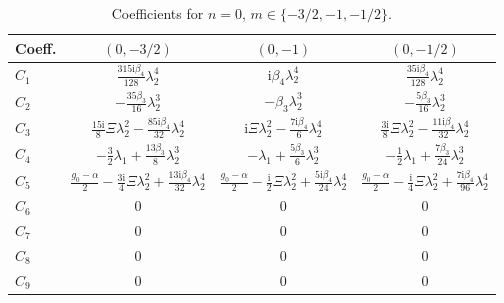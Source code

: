 \documentclass[11pt]{article}
\newcommand{\ii}{\mathrm{i}}
\begin{document}
\begin{table}[htbp]
\centering\small
\caption{Coefficients for $n=0$, $m\in\{-3/2,-1,-1/2\}$.}
\begin{tabular}{lccc}
\toprule
Coeff. & $(0,-3/2)$ & $(0,-1)$ & $(0,-1/2)$ \\
\midrule
$C_1$ & $\tfrac{315\ii\beta_4}{128}\lambda_2^4$ & $\ii\beta_4\lambda_2^4$ & $\tfrac{35\ii\beta_4}{128}\lambda_2^4$ \\
$C_2$ & $-\tfrac{35\beta_3}{16}\lambda_2^3$ & $-\beta_3\lambda_2^3$ & $-\tfrac{5\beta_3}{16}\lambda_2^3$ \\
$C_3$ & $\tfrac{15\ii}{8}\Xi\lambda_2^2-\tfrac{85\ii\beta_4}{32}\lambda_2^4$ & $\ii\Xi\lambda_2^2-\tfrac{7\ii\beta_4}{6}\lambda_2^4$ & $\tfrac{3\ii}{8}\Xi\lambda_2^2-\tfrac{11\ii\beta_4}{32}\lambda_2^4$ \\
$C_4$ & $-\tfrac32\lambda_1+\tfrac{13\beta_3}{8}\lambda_2^3$ & $-\lambda_1+\tfrac{5\beta_3}{6}\lambda_2^3$ & $-\tfrac12\lambda_1+\tfrac{7\beta_3}{24}\lambda_2^3$ \\
$C_5$ & $\tfrac{g_0-\alpha}{2}-\tfrac{3\ii}{4}\Xi\lambda_2^2+\tfrac{13\ii\beta_4}{32}\lambda_2^4$ & $\tfrac{g_0-\alpha}{2}-\tfrac{\ii}{2}\Xi\lambda_2^2+\tfrac{5\ii\beta_4}{24}\lambda_2^4$ & $\tfrac{g_0-\alpha}{2}-\tfrac{\ii}{4}\Xi\lambda_2^2+\tfrac{7\ii\beta_4}{96}\lambda_2^4$ \\
$C_6$ & $0$ & $0$ & $0$ \\
$C_7$ & $0$ & $0$ & $0$ \\
$C_8$ & $0$ & $0$ & $0$ \\
$C_9$ & $0$ & $0$ & $0$ \\
\bottomrule
\end{tabular}
\end{table}
\end{document}
